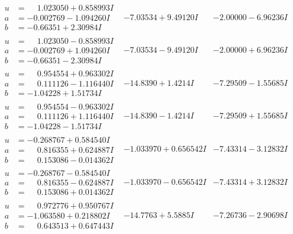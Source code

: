 \documentclass[1p]{elsarticle_modified}
\theoremstyle{definition}
\begin{document}
$$\begin{array}{c|c|c}
\begin{aligned}
u &= \phantom{-}1.023050 + 0.858993 I \\
a &= -0.002769 - 1.094260 I \\
b &= -0.66351 + 2.30984 I\end{aligned}
 & -7.03534 + 9.49120 I & -2.00000 - 6.96236 I \\ \hline\begin{aligned}
u &= \phantom{-}1.023050 - 0.858993 I \\
a &= -0.002769 + 1.094260 I \\
b &= -0.66351 - 2.30984 I\end{aligned}
 & -7.03534 - 9.49120 I & -2.00000 + 6.96236 I \\ \hline\begin{aligned}
u &= \phantom{-}0.954554 + 0.963302 I \\
a &= \phantom{-}0.111126 - 1.116440 I \\
b &= -1.04228 + 1.51734 I\end{aligned}
 & -14.8390 + 1.4214 I & -7.29509 - 1.55685 I \\ \hline\begin{aligned}
u &= \phantom{-}0.954554 - 0.963302 I \\
a &= \phantom{-}0.111126 + 1.116440 I \\
b &= -1.04228 - 1.51734 I\end{aligned}
 & -14.8390 - 1.4214 I & -7.29509 + 1.55685 I \\ \hline\begin{aligned}
u &= -0.268767 + 0.584540 I \\
a &= \phantom{-}0.816355 + 0.624887 I \\
b &= \phantom{-}0.153086 - 0.014362 I\end{aligned}
 & -1.033970 + 0.656542 I & -7.43314 - 3.12832 I \\ \hline\begin{aligned}
u &= -0.268767 - 0.584540 I \\
a &= \phantom{-}0.816355 - 0.624887 I \\
b &= \phantom{-}0.153086 + 0.014362 I\end{aligned}
 & -1.033970 - 0.656542 I & -7.43314 + 3.12832 I \\ \hline\begin{aligned}
u &= \phantom{-}0.972776 + 0.950767 I \\
a &= -1.063580 + 0.218802 I \\
b &= \phantom{-}0.643513 + 0.647443 I\end{aligned}
 & -14.7763 + 5.5885 I & -7.26736 - 2.90698 I \\ \hline\begin{aligned}

\end{aligned}
\end{array}$$
\end{document}
